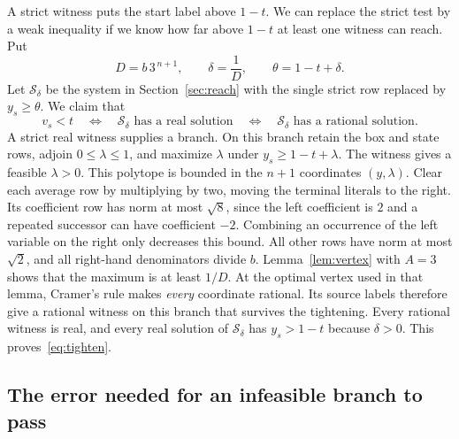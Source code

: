 \documentclass[11pt,letterpaper]{article}
\newcommand{\sys}{\mathcal S}
\begin{document}
A strict witness puts the start label above \(1-t\). We can replace the strict
test by a weak inequality if we know how far above \(1-t\) at least one
witness can reach. Put
\[
              D=b\,3^{\,n+1},\qquad \delta=\frac1D,
              \qquad \theta=1-t+\delta .
\]
Let \(\sys_\delta\) be the system in Section~\ref{sec:reach} with the single strict
row replaced by \(y_s\ge\theta\). We claim that
\begin{equation}\label{eq:tighten}
 v_s<t \quad\Longleftrightarrow\quad \sys_\delta\text{ has a real solution}
       \quad\Longleftrightarrow\quad \sys_\delta\text{ has a rational solution}.
\end{equation}
A strict real witness supplies a branch. On this branch retain the box and state
rows, adjoin \(0\le\lambda\le1\), and maximize \(\lambda\) under
\(y_s\ge1-t+\lambda\). The witness gives a feasible \(\lambda>0\).
This polytope is bounded in the \(n+1\)
coordinates \((y,\lambda)\). Clear each average row by multiplying by two, moving
the terminal literals to the right. Its coefficient row has norm at most
\(\sqrt8\), since the left coefficient is \(2\) and a repeated successor can have
coefficient \(-2\). Combining an occurrence of the left variable on the right
only decreases this bound. All other rows have norm at most \(\sqrt2\), and
all right-hand denominators divide \(b\). Lemma~\ref{lem:vertex} with \(A=3\)
shows that the maximum is at least \(1/D\). At the optimal vertex used in that
lemma, Cramer's rule makes \emph{every} coordinate rational. Its source labels
therefore give a rational witness on this branch that survives the tightening.
Every rational witness is real, and every real solution of \(\sys_\delta\) has
\(y_s>1-t\) because \(\delta>0\). This proves~\eqref{eq:tighten}.

\subsection{The error needed for an infeasible branch to pass}
\end{document}
